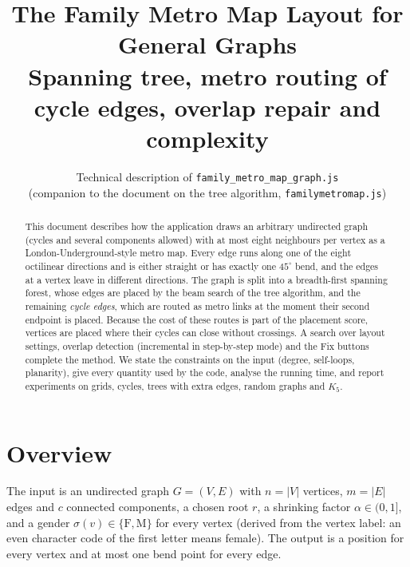 \documentclass[11pt,a4paper]{article}
\title{\textbf{The Family Metro Map Layout for General Graphs}\\[2pt]
\large Spanning tree, metro routing of cycle edges, overlap repair and complexity}
\author{Technical description of \texttt{family\_metro\_map\_graph.js}\\
(companion to the document on the tree algorithm, \texttt{familymetromap.js})}
\date{}
\begin{document}
\maketitle

\begin{abstract}
\noindent This document describes how the application draws an arbitrary undirected graph (cycles and several components allowed) with at most eight neighbours per vertex as a London-Underground-style metro map. Every edge runs along one of the eight octilinear directions and is either straight or has exactly one $45^\circ$ bend, and the edges at a vertex leave in different directions. The graph is split into a breadth-first spanning forest, whose edges are placed by the beam search of the tree algorithm, and the remaining \emph{cycle edges}, which are routed as metro links at the moment their second endpoint is placed. Because the cost of these routes is part of the placement score, vertices are placed where their cycles can close without crossings. A search over layout settings, overlap detection (incremental in step-by-step mode) and the Fix buttons complete the method. We state the constraints on the input (degree, self-loops, planarity), give every quantity used by the code, analyse the running time, and report experiments on grids, cycles, trees with extra edges, random graphs and $K_5$.
\end{abstract}

\setcounter{tocdepth}{1}
\tableofcontents
\bigskip

\section{Overview}

The input is an undirected graph $G=(V,E)$ with $n=|V|$ vertices, $m=|E|$ edges and $c$ connected components, a chosen root $r$, a shrinking factor $\alpha\in(0,1]$, and a gender $\sigma(v)\in\{\mathrm F,\mathrm M\}$ for every vertex (derived from the vertex label: an even character code of the first letter means female). The output is a position for every vertex and at most one bend point for every edge.
\end{document}

